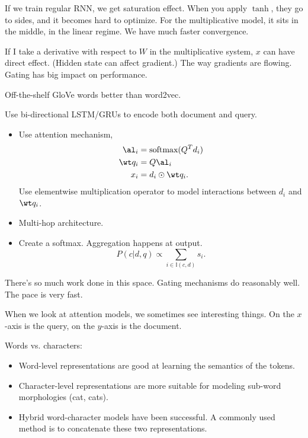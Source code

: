 If we train regular RNN, we get saturation effect. When you apply $\tanh$, they go to sides, and it becomes hard to optimize. For the multiplicative model, it sits in the middle, in the linear regime. We have much faster convergence.


If I take a derivative with respect to $W$ in the multiplicative system, $x$ can have direct effect. (Hidden state can affect gradient.) The way gradients are flowing. Gating has big impact on performance.



Off-the-shelf GloVe words better than word2vec.

Use bi-directional LSTM/GRUs %
to encode both document and query. 
\begin{itemize}
\item
Use attention mechanism, 
\begin{align}
\al_i &=\text{softmax}(Q^Td_i)\\
\wt q_i &= Q\al_i\\
x_i &= d_i \odot \wt q_i.
\end{align}
Use elementwise multiplication operator to model interactions between $d_i$ and $\wt q_i$. 
\item
Multi-hop architecture. 
\item
Create a softmax. Aggregation happens at output.
$$ P(c|d,q)\propto \sum_{i\in \mathbb I(c,d)}s_i.$$
\end{itemize}
There's so much work done in this space.  Gating mechanisms do reasonably well. The pace is very fast.

When we look at attention models, we sometimes see interesting things. On the $x$-axis is the query, on the $y$-axis is the document. 


Words vs. characters:
\begin{itemize}
\item
Word-level representations are good at learning the semantics of the tokens.
\item
Character-level representations are more suitable for modeling sub-word morphologies (cat, cats). 
\item
Hybrid word-character models have been successful. A commonly used method is to concatenate these two representations. 
\end{itemize}

